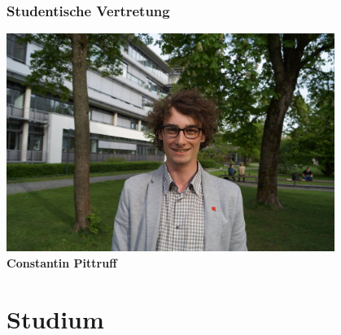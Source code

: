 \documentclass{beamer}
\begin{document}
    \begin{frame}[t]
    	\frametitle{Studentische Vertretung}
    	\center
    	\includegraphics[width=0.8\textwidth]{pittruff.jpg}
    	\\
    	\textbf{Constantin Pittruff}
    \end{frame}
    
    \section{Studium}
    
\end{document}

